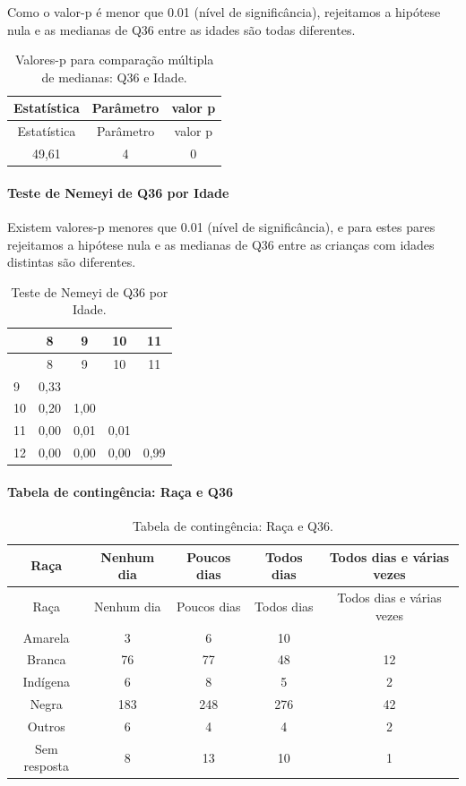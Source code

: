\documentclass[]{article}
\let\oldparagraph\paragraph
\renewcommand{\paragraph}[1]{\oldparagraph{#1}\mbox{}}
\begin{document}
Como o valor-p é menor que 0.01 (nível de significância), rejeitamos a hipótese nula e as medianas de Q36 entre as idades são todas diferentes.

\begin{longtable}[]{@{}ccc@{}}
\caption{\label{tab:unnamed-chunk-1338}Valores-p para comparação múltipla de medianas: Q36 e Idade.}\tabularnewline
\toprule
Estatística & Parâmetro & valor p\tabularnewline
\midrule
\endfirsthead
\toprule
Estatística & Parâmetro & valor p\tabularnewline
\midrule
\endhead
49,61 & 4 & 0\tabularnewline
\bottomrule
\end{longtable}

\hypertarget{teste-de-nemeyi-de-q36-por-idade}{%
\paragraph{Teste de Nemeyi de Q36 por Idade}\label{teste-de-nemeyi-de-q36-por-idade}}

Existem valores-p menores que 0.01 (nível de significância), e para estes pares rejeitamos a hipótese nula e as medianas de Q36 entre as crianças com idades distintas são diferentes.

\begin{longtable}[]{@{}lcccc@{}}
\caption{\label{tab:unnamed-chunk-1340}Teste de Nemeyi de Q36 por Idade.}\tabularnewline
\toprule
& 8 & 9 & 10 & 11\tabularnewline
\midrule
\endfirsthead
\toprule
& 8 & 9 & 10 & 11\tabularnewline
\midrule
\endhead
9 & 0,33 & & &\tabularnewline
10 & 0,20 & 1,00 & &\tabularnewline
11 & 0,00 & 0,01 & 0,01 &\tabularnewline
12 & 0,00 & 0,00 & 0,00 & 0,99\tabularnewline
\bottomrule
\end{longtable}

\cleardoublepage

\hypertarget{tabela-de-continguxeancia-rauxe7a-e-q36}{%
\paragraph{Tabela de contingência: Raça e Q36}\label{tabela-de-continguxeancia-rauxe7a-e-q36}}

\begin{longtable}[]{@{}ccccc@{}}
\caption{\label{tab:unnamed-chunk-1341}Tabela de contingência: Raça e Q36.}\tabularnewline
\toprule
Raça & Nenhum dia & Poucos dias & Todos dias & Todos dias e várias vezes\tabularnewline
\midrule
\endfirsthead
\toprule
Raça & Nenhum dia & Poucos dias & Todos dias & Todos dias e várias vezes\tabularnewline
\midrule
\endhead
Amarela & 3 & 6 & 10 &\tabularnewline
Branca & 76 & 77 & 48 & 12\tabularnewline
Indígena & 6 & 8 & 5 & 2\tabularnewline
Negra & 183 & 248 & 276 & 42\tabularnewline
Outros & 6 & 4 & 4 & 2\tabularnewline
Sem resposta & 8 & 13 & 10 & 1\tabularnewline
\bottomrule
\end{longtable}
\end{document}
